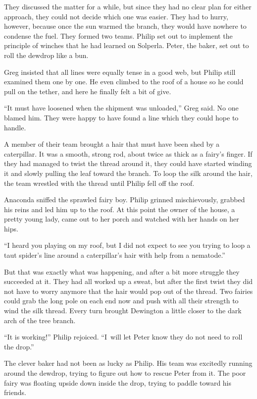 \documentclass[10pt]{memoir}
\begin{document}
They discussed the matter for a while, but since they had no clear plan for
either approach, they could not decide which one was easier. They had to hurry,
however, because once the sun warmed the branch, they would have nowhere to
condense the fuel. They formed two teams. Philip set out to implement the
principle of winches that he had learned on Solperla. Peter, the baker, set out
to roll the dewdrop like a bun.

Greg insisted that all lines were equally tense in a good web, but Philip still
examined them one by one. He even climbed to the roof of a house so he could
pull on the tether, and here he finally felt a bit of give.

``It must have loosened when the shipment was unloaded,'' Greg said. No one
blamed him. They were happy to have found a line which they could hope to
handle.

A member of their team brought a hair that must have been shed by a
caterpillar. It was a smooth, strong rod, about twice as thick as a fairy's
finger. If they had managed to twist the thread around it, they could have
started winding it and slowly pulling the leaf toward the branch. To loop the
silk around the hair, the team wrestled with the thread until Philip fell off
the roof.

Anaconda sniffed the sprawled fairy boy. Philip grinned mischievously, grabbed
his reins and led him up to the roof. At this point the owner of the house, a
pretty young lady, came out to her porch and watched with her hands on her
hips.

``I heard you playing on my roof, but I did not expect to see you trying to
loop a taut spider's line around a caterpillar's hair with help from a
nematode.''

But that was exactly what was happening, and after a bit more struggle they
succeeded at it. They had all worked up a sweat, but after the first twist they
did not have to worry anymore that the hair would pop out of the thread. Two
fairies could grab the long pole on each end now and push with all their
strength to wind the silk thread. Every turn brought Dewington a little closer
to the dark arch of the tree branch.

``It is working!'' Philip rejoiced. ``I~will let Peter know they do not need to
roll the drop.''

The clever baker had not been as lucky as Philip. His team was excitedly
running around the dewdrop, trying to figure out how to rescue Peter from it.
The poor fairy was floating upside down inside the drop, trying to paddle
toward his friends.
\end{document}
